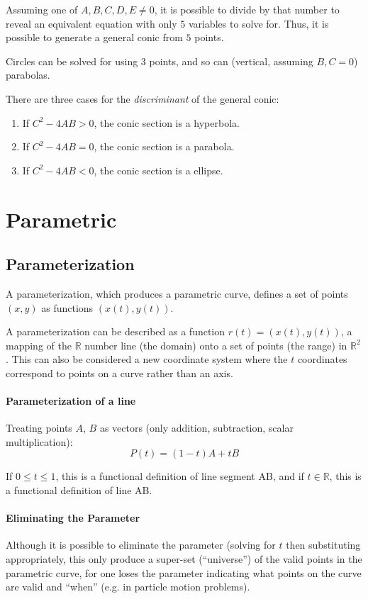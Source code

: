 \documentclass{article}
\begin{document}
Assuming one of $A, B, C, D, E \ne 0$, it is possible to divide by that number to reveal an equivalent equation with only $5$ variables to solve for. Thus, it is possible to generate a general conic from $5$ points.

Circles can be solved for using $3$ points, and so can (vertical, assuming $B, C = 0$) parabolas.

There are three cases for the \emph{discriminant} of the general conic:
\begin{enumerate}
    \item If $C^2 - 4AB > 0$, the conic section is a hyperbola.
    \item If $C^2 - 4AB = 0$, the conic section is a parabola.
    \item If $C^2 - 4AB < 0$, the conic section is a ellipse.
\end{enumerate}

\section{Parametric}
\subsection{Parameterization}
A parameterization, which produces a parametric curve, defines a set of points $(x, y)$ as functions $(x(t), y(t))$.

A parameterization can be described as a function $r(t) = (x(t), y(t))$, a mapping of the $\mathbb{R}$ number line (the domain) onto a set of points (the range) in $\mathbb{R}^2$. This can also be considered a new coordinate system where the $t$ coordinates correspond to points on a curve rather than an axis.


\paragraph{Parameterization of a line}
Treating points $A$, $B$ as vectors (only addition, subtraction, scalar multiplication):
$$P(t) = (1-t)A + tB$$

If $0 \le t \le 1$, this is a functional definition of line segment AB, and if $t \in \mathbb{R}$, this is a functional definition of line AB.

\paragraph{Eliminating the Parameter}
Although it is possible to eliminate the parameter (solving for $t$ then substituting appropriately, this only produce a super-set (``universe'') of the valid points in the parametric curve, for one loses the parameter indicating what points on the curve are valid and ``when'' (e.g. in particle motion problems).
\end{document}
